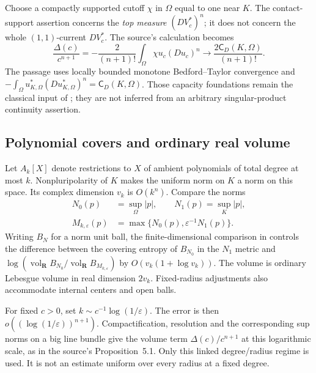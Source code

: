 Choose a compactly supported cutoff $\chi$ in $\Omega$ equal
to one near $K$. The contact-support assertion concerns the
\emph{top measure} $(DV_c^*)^n$; it does not concern the whole
$(1,1)$-current $DV_c^*$. The source's calculation becomes
\[
 \frac{\Delta(c)}{c^{n+1}}
  =-\frac{2}{(n+1)!}\int_\Omega
                    \chi u_c(Du_c)^n
  \longrightarrow
       \frac{2\mathsf C_D(K,\Omega)}{(n+1)!}.
 \tag{H.142}\label{eq:appH-holomorphic-capacity-passage}
\]
The passage uses locally bounded monotone Bedford--Taylor
convergence and
$-\int_\Omega u_{K,\Omega}^*(Du_{K,\Omega}^*)^n
=\mathsf C_D(K,\Omega)$. Those capacity foundations remain
the classical input of \cite{BT82}; they are not inferred
from an arbitrary singular-product continuity assertion.

\subsection{Polynomial covers and ordinary real volume}

Let $A_k[X]$ denote restrictions to $X$ of ambient polynomials
of total degree at most $k$. Nonpluripolarity of $K$ makes the
uniform norm on $K$ a norm on this space. Its complex dimension
$v_k$ is $O(k^n)$. Compare the norms
\[
\begin{aligned}
 N_0(p)&=\sup_\Omega|p|,\qquad N_1(p)=\sup_K|p|,\\
 M_{k,\varepsilon}(p)&=\max\{N_0(p),\varepsilon^{-1}N_1(p)\}.
\end{aligned}
 \tag{H.143}\label{eq:appH-holomorphic-max-norm}
\]
Writing $B_N$ for a norm unit ball, the finite-dimensional
comparison in \cite[Proposition~2.1]{Finski26HolomorphicEntropyV1}
controls the difference between the covering entropy of
$B_{N_0}$ in the $N_1$ metric and
$\log(\operatorname{vol}_{\mathbf R}B_{N_0}/
\operatorname{vol}_{\mathbf R}B_{M_{k,\varepsilon}})$
by $O(v_k(1+\log v_k))$. The volume is ordinary Lebesgue
volume in real dimension $2v_k$. Fixed-radius adjustments
also accommodate internal centers and open balls.

For fixed $c>0$, set $k\sim c^{-1}\log(1/\varepsilon)$.
The error is then $o((\log(1/\varepsilon))^{n+1})$.
Compactification, resolution and the corresponding sup norms
on a big line bundle give the volume term $\Delta(c)/c^{n+1}$
at this logarithmic scale, as in the source's Proposition~5.1.
Only this linked degree/radius regime is used. It is not an
estimate uniform over every radius at a fixed degree.

